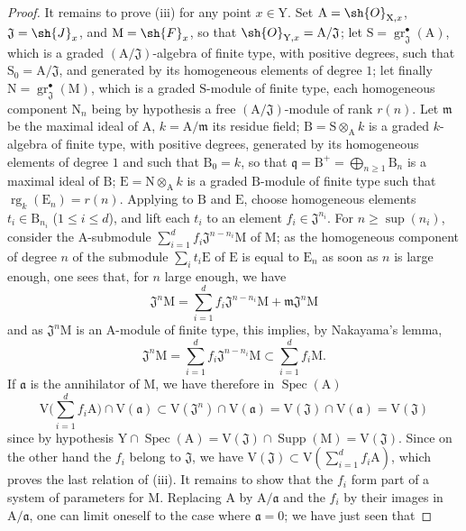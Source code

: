 \begin{proof}
It remains to prove (iii) for any point $x\in\mathrm{Y}$. Set $\mathrm{A}=\sh{O}_{\mathrm{X},x}$, $\mathfrak{J}=\sh{J}_x$, and $\mathrm{M}=\sh{F}_x$, so that $\sh{O}_{\mathrm{Y},x}=\mathrm{A}/\mathfrak{J}$; let $\mathrm{S}=\operatorname{gr}^{\bullet}_\mathfrak{J}(\mathrm{A})$, which is a graded $(\mathrm{A}/\mathfrak{J})$-algebra of finite type, with positive degrees, such that $\mathrm{S}_0=\mathrm{A}/\mathfrak{J}$, and generated by its homogeneous elements of degree $1$; let finally $\mathrm{N}=\operatorname{gr}^{\bullet}_\mathfrak{J}(\mathrm{M})$, which is a graded $\mathrm{S}$-module of finite type, each homogeneous component $\mathrm{N}_n$ being by hypothesis a free $(\mathrm{A}/\mathfrak{J})$-module of rank $r(n)$. Let $\mathfrak{m}$ be the maximal ideal of $\mathrm{A}$, $k=\mathrm{A}/\mathfrak{m}$ its residue field; $\mathrm{B}=\mathrm{S}\otimes_\mathrm{A}k$ is a graded $k$-algebra of finite type, with positive degrees, generated by its homogeneous elements of degree $1$ and such that $\mathrm{B}_0=k$, so that $\mathfrak{q}=\mathrm{B}^+=\bigoplus_{n\geqslant 1}\mathrm{B}_n$ is a maximal ideal of $\mathrm{B}$; $\mathrm{E}=\mathrm{N}\otimes_\mathrm{A}k$ is a graded $\mathrm{B}$-module of finite type such that $\operatorname{rg}_k(\mathrm{E}_n)=r(n)$. Applying  to $\mathrm{B}$ and $\mathrm{E}$, choose homogeneous elements $t_i\in\mathrm{B}_{n_i}$ ($1\leqslant i\leqslant d$), and lift each $t_i$ to an element $f_i\in\mathfrak{J}^{n_i}$. For $n\geqslant\sup(n_i)$, consider the $\mathrm{A}$-submodule $\sum_{i=1}^d f_i\mathfrak{J}^{n-n_i}\mathrm{M}$ of $\mathrm{M}$; as the homogeneous component of degree $n$ of the submodule $\sum_i t_i\mathrm{E}$ of $\mathrm{E}$ is equal to $\mathrm{E}_n$ as soon as $n$ is large enough, one sees that, for $n$ large enough, we have
\[
\mathfrak{J}^n\mathrm{M} = \sum_{i=1}^d f_i\mathfrak{J}^{n-n_i}\mathrm{M}+\mathfrak{m}\mathfrak{J}^n\mathrm{M}
\]
and as $\mathfrak{J}^n\mathrm{M}$ is an $\mathrm{A}$-module of finite type, this implies, by Nakayama's lemma,
\[
\mathfrak{J}^n\mathrm{M} = \sum_{i=1}^d f_i\mathfrak{J}^{n-n_i}\mathrm{M} \subset \sum_{i=1}^d f_i\mathrm{M}.
\]
If $\mathfrak{a}$ is the annihilator of $\mathrm{M}$, we have therefore  in $\operatorname{Spec}(\mathrm{A})$
\[
\mathrm{V}\Big(\sum_{i=1}^d f_i\mathrm{A}\Big)\cap\mathrm{V}(\mathfrak{a})\subset\mathrm{V}(\mathfrak{J}^n)\cap\mathrm{V}(\mathfrak{a})=\mathrm{V}(\mathfrak{J})\cap\mathrm{V}(\mathfrak{a})=\mathrm{V}(\mathfrak{J})
\]
since by hypothesis $\mathrm{Y}\cap\operatorname{Spec}(\mathrm{A})=\mathrm{V}(\mathfrak{J})\cap\operatorname{Supp}(\mathrm{M})=\mathrm{V}(\mathfrak{J})$. Since on the other hand the $f_i$ belong to $\mathfrak{J}$, we have $\mathrm{V}(\mathfrak{J})\subset\mathrm{V}(\sum_{i=1}^d f_i\mathrm{A})$, which proves the last relation of (iii). It remains to show that the $f_i$ form part of a system of parameters for $\mathrm{M}$. Replacing $\mathrm{A}$ by $\mathrm{A}/\mathfrak{a}$ and the $f_i$ by their images in $\mathrm{A}/\mathfrak{a}$, one can limit oneself to the case where $\mathfrak{a}=0$; we have just seen that

\end{proof}
